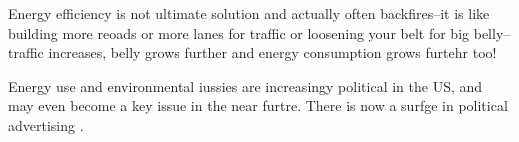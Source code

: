 \documentclass[10pt, letterpaper]{article}
\begin{document}
\begin{spacing}{1.4}
Energy efficiency is not ultimate solution and actually often backfires--it is
like building more reoads or more lanes for traffic or loosening your belt for
big belly--traffic increases, belly grows further and energy consumption grows
furtehr too!

Energy use and environmental iussies are  increasingy political in the US, and
may even become a key issue in the near furtre. There is now a surfge in
political advertising \citep{davenport_nyt_oct21_14}.


\newpage









\end{spacing}
\end{document}
